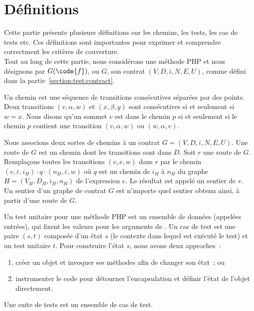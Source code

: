 \section{Définitions}
\label{section:test:definitions}

Cette partie présente plusieurs définitions sur les chemins, les tests, les cas
de tests etc. Ces définitions sont importantes pour exprimer et comprendre
correctment les critères de couverture. \\

Tout au long de cette partie, nous considérons une méthode PHP  et nous
désignons par $G(\code{f})$, ou $G$, son contrat $(V, D, i, N, E, U)$, comme
défini dans la partie~\ref{section:test:contract}.

Un {\strong chemin} est une séquence de transitions consécutives séparées par
des points. Deux transitions $(v, \alpha, w)$ et $(x, \beta, y)$ sont
consécutives si et seulement si $w = x$. Nous disons qu'un sommet $v$ {\strong
est dans} le chemin $p$ si et seulement si le chemin $p$ contient une transition
$(v, \alpha, w)$ ou $(w, \alpha, v)$.

Nous associons deux sortes de chemins à un contrat $G = (V, D, i, N, E, U)$. Une
{\strong route} de $G$ est un chemin dont les transitions sont dans $D$. Soit
$r$ une route de $G$. Remplaçons toutes les transitions $(v, e, w)$ dans $r$
par le chemin $(v, \varepsilon, i_H) \cdot q \cdot (n_H, \varepsilon, w)$ où $q$
est un chemin de $i_H$ à $n_H$ du graphe $H = (V_H, D_H, i_H, n_H)$ de
l'expression $e$. Le résultat est appelé un {\strong sentier} de $r$. Un sentier
d'un graphe de contrat $G$ est n'importe quel sentier obtenu ainsi, à partir
d'une route de $G$.

Un {\strong test unitaire} pour une méthode PHP  est un ensemble de
données (appelées entrées), qui fixent les valeurs pour les
arguments de . Un {\strong cas de test} est une paire $(s, t)$ composée
d'un état $s$ (le contexte dans lequel est exécuté le test) et un test unitaire
$t$. Pour construire l'état $s$, nous avons deux approches~:
%
\begin{enumerate}

\item créer un objet et invoquer ses méthodes afin de changer son état~; ou

\item instrumenter le code pour détourner l'encapsulation et définir l'état de
l'objet directement.

\end{enumerate}
%
Une {\strong suite de tests} est un ensemble de cas de test.

